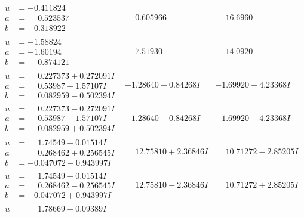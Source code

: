 \documentclass[1p]{elsarticle_modified}
\theoremstyle{definition}
\begin{document}
$$\begin{array}{c|c|c}
\begin{aligned}
u &= -0.411824\phantom{ +0.000000I} \\
a &= \phantom{-}0.523537\phantom{ +0.000000I} \\
b &= -0.318922\phantom{ +0.000000I}\end{aligned}
 & \phantom{-}0.605966\phantom{ +0.000000I} & \phantom{-}16.6960\phantom{ +0.000000I} \\ \hline\begin{aligned}
u &= -1.58824\phantom{ +0.000000I} \\
a &= -1.60194\phantom{ +0.000000I} \\
b &= \phantom{-}0.874121\phantom{ +0.000000I}\end{aligned}
 & \phantom{-}7.51930\phantom{ +0.000000I} & \phantom{-}14.0920\phantom{ +0.000000I} \\ \hline\begin{aligned}
u &= \phantom{-}0.227373 + 0.272091 I \\
a &= \phantom{-}0.53987 - 1.57107 I \\
b &= \phantom{-}0.082959 - 0.502394 I\end{aligned}
 & -1.28640 + 0.84268 I & -1.69920 - 4.23368 I \\ \hline\begin{aligned}
u &= \phantom{-}0.227373 - 0.272091 I \\
a &= \phantom{-}0.53987 + 1.57107 I \\
b &= \phantom{-}0.082959 + 0.502394 I\end{aligned}
 & -1.28640 - 0.84268 I & -1.69920 + 4.23368 I \\ \hline\begin{aligned}
u &= \phantom{-}1.74549 + 0.01514 I \\
a &= \phantom{-}0.268462 + 0.256545 I \\
b &= -0.047072 - 0.943997 I\end{aligned}
 & \phantom{-}12.75810 + 2.36846 I & \phantom{-}10.71272 - 2.85205 I \\ \hline\begin{aligned}
u &= \phantom{-}1.74549 - 0.01514 I \\
a &= \phantom{-}0.268462 - 0.256545 I \\
b &= -0.047072 + 0.943997 I\end{aligned}
 & \phantom{-}12.75810 - 2.36846 I & \phantom{-}10.71272 + 2.85205 I \\ \hline\begin{aligned}
u &= \phantom{-}1.78669 + 0.09389 I \\

\end{aligned}
\end{array}$$
\end{document}
